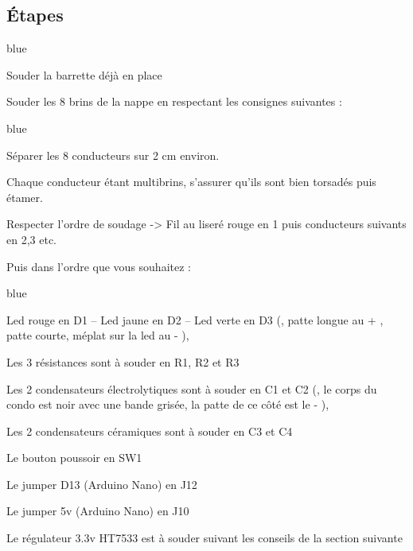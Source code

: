 \subsection{Étapes}
\begin{items}{blue}{\Triangle}
\item Souder la barrette déjà en place


 
\item Souder les 8 brins de la nappe en respectant les consignes suivantes : 

\begin{items}{blue}{\Triangle}
\item Séparer les 8 conducteurs sur 2 cm environ.	
\item Chaque conducteur étant multibrins, s'assurer qu'ils sont bien torsadés puis étamer.
\item Respecter l'ordre de soudage -> Fil au liseré rouge en 1 puis conducteurs suivants en 2,3 	   etc.
\end{items}

 
\end{items}

Puis dans l'ordre que vous souhaitez : 
\begin{items}{blue}{\Triangle}
    \item Led rouge en D1 – Led jaune en D2 – Led verte en D3 (, patte longue au + ,  patte courte, méplat sur la led au - ),
    \item Les 3 résistances sont à souder en R1, R2 et R3
    \item Les 2 condensateurs électrolytiques sont à souder en C1 et C2 (, le corps du condo est noir avec une bande grisée, la patte de ce côté est le - ),
    \item Les 2 condensateurs céramiques sont à souder en C3 et C4
    \item Le bouton poussoir en SW1
    \item Le jumper D13 (Arduino Nano) en J12
    \item Le jumper 5v (Arduino Nano) en J10
    \item Le régulateur 3.3v HT7533 est à souder suivant les conseils de la section suivante
\end{items}

